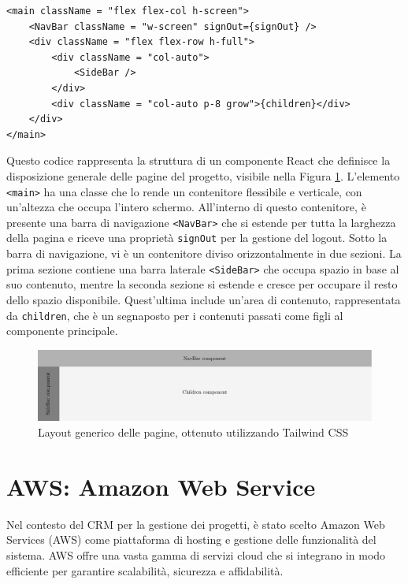 \documentclass[target=bach,aauheader=,style=]{thud}
\begin{document}
\begin{lstlisting}[caption=Parte del file \texttt{app.tsx} del CRM]
<main className = "flex flex-col h-screen">
    <NavBar className = "w-screen" signOut={signOut} />
    <div className = "flex flex-row h-full">
        <div className = "col-auto">
            <SideBar />
        </div>
        <div className = "col-auto p-8 grow">{children}</div>
    </div>
</main> 
\end{lstlisting}

\noindent Questo codice rappresenta la struttura di un componente React che definisce la disposizione generale delle pagine del progetto, visibile nella Figura \ref{layout}. L'elemento \texttt{<main>} ha una classe che lo rende un contenitore flessibile e verticale, con un'altezza che occupa l'intero schermo. All'interno di questo contenitore, è presente una barra di navigazione \texttt{<NavBar>} che si estende per tutta la larghezza della pagina e riceve una proprietà \texttt{signOut} per la gestione del logout. Sotto la barra di navigazione, vi è un contenitore diviso orizzontalmente in due sezioni. La prima sezione contiene una barra laterale \texttt{<SideBar>} che occupa spazio in base al suo contenuto, mentre la seconda sezione si estende e cresce per occupare il resto dello spazio disponibile. Quest'ultima include un'area di contenuto, rappresentata da \texttt{{children}}, che è un segnaposto per i contenuti passati come figli al componente principale.

\begin{figure}[H]
    \centering
    \includegraphics[width=1\textwidth]{img/layout.pdf} 
    \caption{Layout generico delle pagine, ottenuto utilizzando Tailwind CSS}
    \label{layout}
\end{figure}


\section{AWS: Amazon Web Service}
Nel contesto del CRM per la gestione dei progetti, è stato scelto Amazon Web Services (AWS) \cite{mathew2014overview} come piattaforma di hosting e gestione delle funzionalità del sistema. AWS offre una vasta gamma di servizi cloud che si integrano in modo efficiente per garantire scalabilità, sicurezza e affidabilità.
\end{document}
